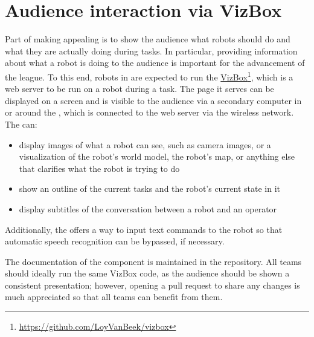 \section{Audience interaction via VizBox}
\label{rule:vizbox}

Part of making \RoboCup\AtHome{} appealing is to show the audience what robots should do and what they are actually doing during tasks.
In particular, providing information about what a robot is doing to the audience is important for the advancement of the league.
To this end, robots in \AtHome{} are expected to run the \RoboCup\AtHome{} \href{https://github.com/LoyVanBeek/vizbox}{VizBox}\footnote{\url{https://github.com/LoyVanBeek/vizbox}}, which is a web server to be run on a robot during a task.
The page it serves can be displayed on a screen and is visible to the audience via a secondary computer in or around the \Arena{}, which is connected to the web server via the wireless network.
The  can:
\begin{itemize}
	\item display images of what a robot can see, such as camera images, or a visualization of the robot's world model, the robot's map, or anything else that clarifies what the robot is trying to do
	\item show an outline of the current tasks and the robot's current state in it
	\item display subtitles of the conversation between a robot and an operator
\end{itemize}
Additionally, the  offers a way to input text commands to the robot so that automatic speech recognition can be bypassed, if necessary.

The documentation of the component is maintained in the  repository.
All teams should ideally run the same VizBox code, as the audience should be shown a consistent presentation; however, opening a pull request to share any changes is much appreciated so that all teams can benefit from them.
